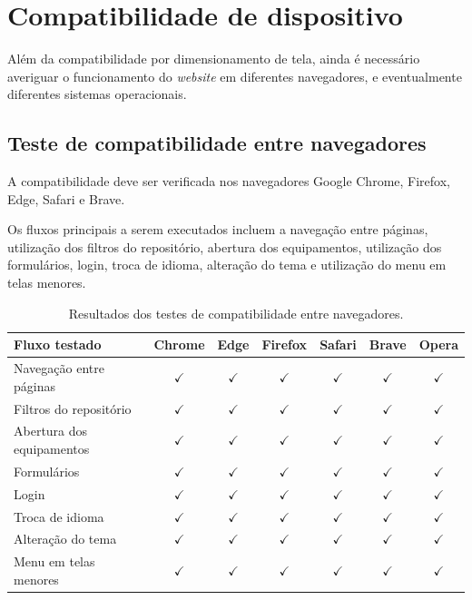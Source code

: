 \vspace{5mm}
\section{Compatibilidade de dispositivo}

Além da compatibilidade por dimensionamento de tela, ainda é necessário averiguar o funcionamento do \textit{website} em diferentes navegadores, e eventualmente diferentes sistemas operacionais. 

\subsection{Teste de compatibilidade entre navegadores}

A compatibilidade deve ser verificada nos navegadores Google Chrome, Firefox, Edge, Safari e Brave.

Os fluxos principais a serem executados incluem a navegação entre páginas, utilização dos filtros do repositório, abertura dos equipamentos, utilização dos formulários, login, troca de idioma, alteração do tema e utilização do menu em telas menores.

\begin{table}[H]
	\centering
	\caption{Resultados dos testes de compatibilidade entre navegadores.}
	\label{tab:compatibilidade-navegadores}
	\renewcommand{\arraystretch}{1.4}
	\setlength{\tabcolsep}{9pt}
	\begin{tabular}{lcccccc}
		\hline
		\textbf{Fluxo testado} &
		\textbf{Chrome} &
		\textbf{Edge} &
		\textbf{Firefox} &
		\textbf{Safari} &
		\textbf{Brave} &
		\textbf{Opera} \\
		\hline
		Navegação entre páginas & $\checkmark$ & $\checkmark$ & $\checkmark$ & $\checkmark$ & $\checkmark$ & $\checkmark$ \\
		Filtros do repositório & $\checkmark$ & $\checkmark$ & $\checkmark$ & $\checkmark$ & $\checkmark$ & $\checkmark$ \\
		Abertura dos equipamentos & $\checkmark$ & $\checkmark$ & $\checkmark$ & $\checkmark$ & $\checkmark$ & $\checkmark$\\
		Formulários & $\checkmark$ & $\checkmark$ & $\checkmark$ & $\checkmark$ & $\checkmark$ & $\checkmark$ \\
		Login & $\checkmark$ & $\checkmark$ & $\checkmark$ & $\checkmark$ & $\checkmark$ & $\checkmark$ \\
		Troca de idioma & $\checkmark$ & $\checkmark$ & $\checkmark$ & $\checkmark$ & $\checkmark$ & $\checkmark$\\
		Alteração do tema & $\checkmark$ & $\checkmark$ & $\checkmark$ & $\checkmark$ & $\checkmark$ & $\checkmark$\\
		Menu em telas menores & $\checkmark$ & $\checkmark$ & $\checkmark$ & $\checkmark$ & $\checkmark$ & $\checkmark$\\
		\hline
	\end{tabular}
\end{table}

